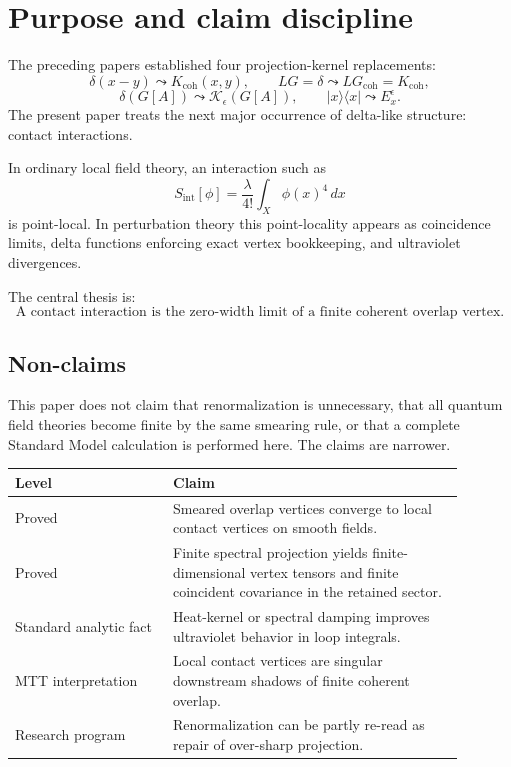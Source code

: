 \documentclass[11pt]{article}
\begin{document}
\section{Purpose and claim discipline}

The preceding papers established four projection-kernel replacements:
\[
\delta(x-y)\leadsto K_{\mathrm{coh}}(x,y),
\qquad
LG=\delta\leadsto LG_{\mathrm{coh}}=K_{\mathrm{coh}},
\]
\[
\delta(G[A])\leadsto \mathcal K_{\epsilon}(G[A]),
\qquad
|x\rangle\langle x|\leadsto E_x^\epsilon .
\]
The present paper treats the next major occurrence of delta-like structure: contact
interactions.

In ordinary local field theory, an interaction such as
\[
S_{\mathrm{int}}[\phi]=\frac{\lambda}{4!}\int_X \phi(x)^4\,dx
\]
is point-local.  In perturbation theory this point-locality appears as coincidence limits,
delta functions enforcing exact vertex bookkeeping, and ultraviolet divergences.

The central thesis is:
\[
\boxed{\text{A contact interaction is the zero-width limit of a finite coherent overlap vertex.}}
\]

\subsection{Non-claims}

This paper does not claim that renormalization is unnecessary, that all quantum field theories
become finite by the same smearing rule, or that a complete Standard Model calculation is
performed here.  The claims are narrower.

\begin{center}
\begin{tabular}{p{0.31\linewidth}p{0.58\linewidth}}
\hline
\textbf{Level} & \textbf{Claim}\\
\hline
Proved & Smeared overlap vertices converge to local contact vertices on smooth fields.\\
Proved & Finite spectral projection yields finite-dimensional vertex tensors and finite
coincident covariance in the retained sector.\\
Standard analytic fact & Heat-kernel or spectral damping improves ultraviolet behavior in loop
integrals.\\
MTT interpretation & Local contact vertices are singular downstream shadows of finite coherent
overlap.\\
Research program & Renormalization can be partly re-read as repair of over-sharp projection.\\
\hline
\end{tabular}
\end{center}
\end{document}

